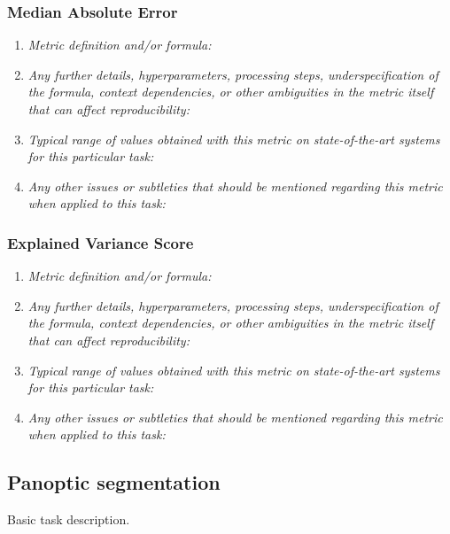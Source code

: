 \documentclass[a4paper,11pt]{article}
\begin{document}
        \subsubsection{Median Absolute Error}
            \begin{enumerate}[label=\alph*.]
                \item \textit{Metric definition and/or formula:}
                \bigskip
                \item \textit{Any further details, hyperparameters, processing steps, underspecification of the formula, context dependencies, or other ambiguities in the metric itself that can affect reproducibility:}
                \bigskip
                \item \textit{Typical range of values obtained with this metric on state-of-the-art systems for this particular task:}
                \bigskip
                \item \textit{Any other issues or subtleties that should be mentioned regarding this metric when applied to this task:}
                \bigskip
            \end{enumerate}
        \subsubsection{Explained Variance Score}
            \begin{enumerate}[label=\alph*.]
                \item \textit{Metric definition and/or formula:}
                \bigskip
                \item \textit{Any further details, hyperparameters, processing steps, underspecification of the formula, context dependencies, or other ambiguities in the metric itself that can affect reproducibility:}
                \bigskip
                \item \textit{Typical range of values obtained with this metric on state-of-the-art systems for this particular task:}
                \bigskip
                \item \textit{Any other issues or subtleties that should be mentioned regarding this metric when applied to this task:}
                \bigskip
            \end{enumerate}


    \subsection{Panoptic segmentation}
        Basic task description.
\end{document}
